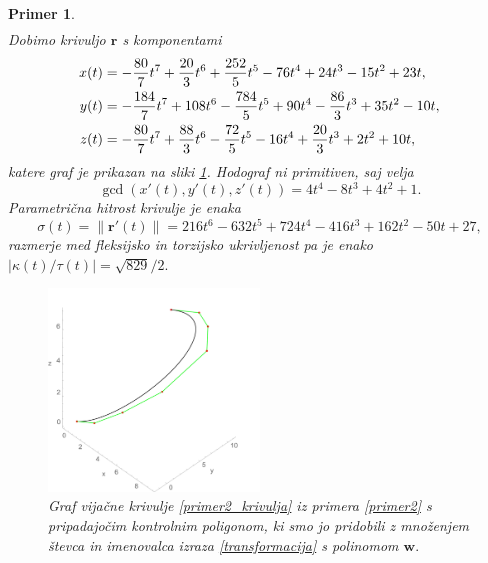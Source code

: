 \documentclass[12pt,a4paper,twoside]{article}
\theoremstyle{definition} %
\theoremstyle{plain} %
\theoremstyle{primerstyle}
\newtheorem{primer}[definicija]{Primer}
\numberwithin{equation}{section}  %
\newcommand{\rV}{\mathbf{r}}
\newcommand{\wV}{\mathbf{w}}
\begin{document}
\begin{primer}
\begin{align*}
	\end{align*}
	Dobimo krivuljo $\rV$ s komponentami
	\begin{align}
		x(t)&=-\frac{80}{7}t^7+\frac{20}{3}t^6+\frac{252}{5}t^5-76t^4+24t^3-15t^2+23t,\notag\\
		y(t)&=-\frac{184}{7}t^7+108t^6-\frac{784}{5}t^5+90t^4-\frac{86}{3}t^3+35t^2-10t,\label{primer2_krivulja}\\
		z(t)&=-\frac{80}{7}t^7+\frac{88}{3}t^6-\frac{72}{5}t^5-16t^4+\frac{20}{3}t^3+2t^2+10t,\notag
	\end{align}
	katere graf je prikazan na sliki \ref{fig:quat_poly_multi}.
	Hodograf ni primitiven, saj velja
	\begin{equation*}
		\gcd(x'(t),y'(t),z'(t))=4t^4-8t^3+4t^2+1.
	\end{equation*}
	Parametrična hitrost krivulje je enaka
	\begin{equation*}
		\sigma(t)=\lVert\rV'(t)\rVert=216t^6-632t^5+724t^4-416t^3+162t^2-50t+27,
	\end{equation*}
	razmerje med fleksijsko in torzijsko ukrivljenost pa je enako $|\kappa(t)/\tau(t)|=\sqrt{829}/2.$
	\begin{figure}[h!]
	  \centering
	  \includegraphics[width=0.5\textwidth]{images/quat_poly_multi.pdf}
	  \caption[Primer vijačne krivulje, pridobljene s postopkom množenja z linearnim polinomom]{Graf vijačne krivulje \eqref{primer2_krivulja} iz primera \ref{primer2} s pripadajočim kontrolnim poligonom, ki smo jo pridobili z množenjem števca in imenovalca izraza \eqref{transformacija} s polinomom $\wV.$}
	  \label{fig:quat_poly_multi}
	\end{figure}
\end{primer}
\end{document}
